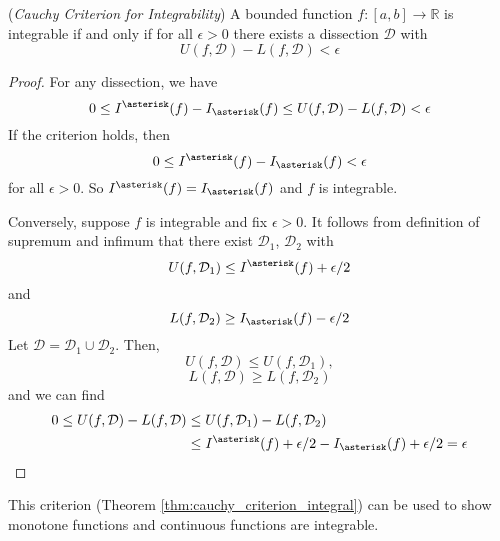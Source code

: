 \documentclass[10pt, a4paper, twoside]{report}
\begin{document}
\begin{theorem}
    (\emph{Cauchy Criterion for Integrability}) A bounded function \(f:[a,b]\to\mathbb{R}\) is integrable if and only if for all \(\epsilon>0\) there exists a dissection \(\mathcal{D}\) with 
    \[U(f,\mathcal{D})-L(f,\mathcal{D})<\epsilon\]
    \label{thm:cauchy_criterion_integral}
\end{theorem}
\begin{proof}
    For any dissection, we have 
    \[0\leq I^\asterisk(f)- I_\asterisk(f)\leq  U(f,\mathcal{D})-L(f,\mathcal{D})<\epsilon\]
    If the criterion holds, then 
    \[0\leq I^\asterisk(f)- I_\asterisk(f)<\epsilon\]
    for all \(\epsilon>0\). So \(I^\asterisk(f)=I_\asterisk(f)\) and \(f\) is integrable.

    Conversely, suppose \(f\) is integrable and fix \(\epsilon>0\). It follows from definition of supremum and infimum that there exist \(\mathcal{D}_1\), \(\mathcal{D}_2\) with 
    \[U(f,\mathcal{D}_1)\leq I^\asterisk(f)+\epsilon/2\]
    and 
    \[L(f,\mathcal{D}_2)\geq I_\asterisk(f)-\epsilon/2\]
    Let \(\mathcal{D}=\mathcal{D}_1\cup\mathcal{D}_2\). Then,
    \[U(f,\mathcal{D})\leq U(f,\mathcal{D}_1),\]
    \[L(f,\mathcal{D})\geq L(f,\mathcal{D}_2)\]
    and we can find
    \begin{align*}
        0\leq U(f,\mathcal{D})-L(f,\mathcal{D})&\leq U(f,\mathcal{D}_1)-L(f,\mathcal{D}_2) \\
        &\leq I^\asterisk(f)+\epsilon/2-I_\asterisk(f)+\epsilon/2=\epsilon
    \end{align*}
\end{proof}
This criterion (Theorem \ref{thm:cauchy_criterion_integral}) can be used to show monotone functions and continuous functions are integrable.
\end{document}

